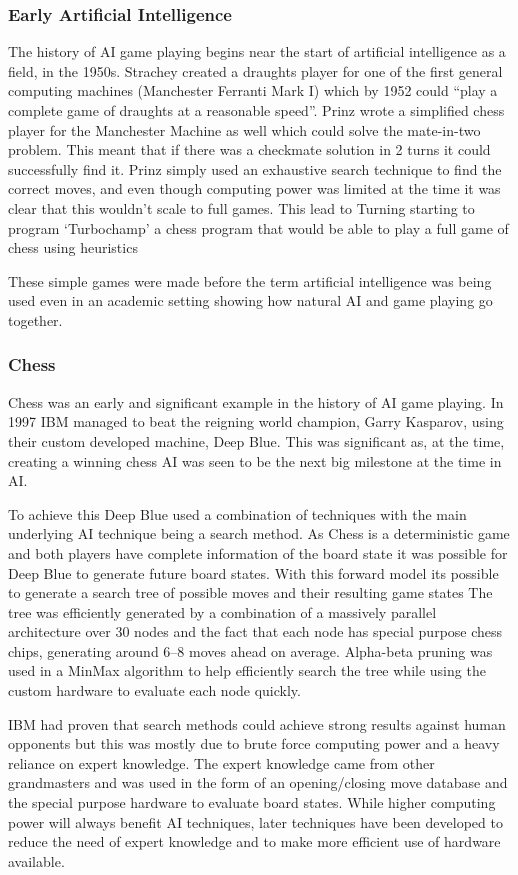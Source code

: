 \documentclass[a4paper]{article}
\begin{document}
\subsubsection{Early Artificial Intelligence}
The history of AI game playing begins near the start of artificial intelligence as a field, in the 1950s.
Strachey created a draughts player for one of the first general computing machines (Manchester Ferranti Mark I) which by  1952 could ``play a complete game of draughts at a reasonable speed''\cite{BreifHistoryComputing}.
Prinz wrote a simplified chess player for the Manchester Machine as well which could solve the mate-in-two problem.
This meant that if there was a checkmate solution in 2 turns it could successfully find it\cite{BreifHistoryComputing}.
Prinz simply used an exhaustive search technique to find the correct moves, and even though computing power was limited at the time it was clear that this wouldn't scale to full games.
This lead to Turning starting to program `Turbochamp' a chess program that would be able to play a full game of chess using heuristics\cite{BreifHistoryComputing}
\par
These simple games were made before the term artificial intelligence was being used even in an academic setting showing how natural AI and game playing go together.

\subsubsection{Chess}
Chess was an early and significant example in the history of AI game playing.
In 1997 IBM managed to beat the reigning world champion, Garry Kasparov, using their custom developed machine, Deep Blue\cite{deepBlue}.
This was significant as, at the time, creating a winning chess AI was seen to be the next big milestone at the time in AI\@.
\par
To achieve this Deep Blue used a combination of techniques with the main underlying AI technique being a search method.
As Chess is a deterministic game and both players have complete information of the board state it was possible for Deep Blue to generate future board states.
With this forward model its possible to generate a search tree of possible moves and their resulting game states
The tree was efficiently generated by a combination of a massively parallel architecture over 30 nodes and the fact that each node has special purpose chess chips, generating around 6--8 moves ahead on average.
Alpha-beta pruning was used in a MinMax algorithm to help efficiently search the tree while using the custom hardware to evaluate each node quickly.
\par
IBM had proven that search methods could achieve strong results against human opponents but this was mostly due to brute force computing power and a heavy reliance on expert knowledge.
The expert knowledge came from other grandmasters and was used in the form of an opening/closing move database and the special purpose hardware to evaluate board states.
While higher computing power will always benefit AI techniques, later techniques have been developed to reduce the need of expert knowledge and to make more efficient use of hardware available.
\end{document}
